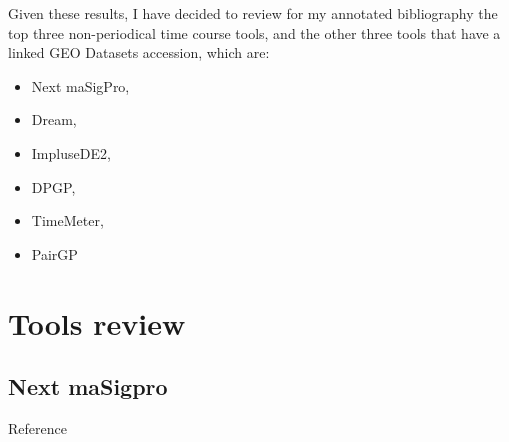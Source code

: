 \documentclass[10pt,a4paper]{article}
\newlength{\templength}
\newenvironment{ann_section}[1]
{\settowidth{\templength}{#1}%
\noindent\textbf{#1}
\hspace{1em}\begin{minipage}[t]{\dimexpr \linewidth-\the\templength-2em}}
{\end{minipage}\par\bigskip}
\begin{document}
Given these results, I have decided to review for my annotated bibliography the top three non-periodical time course tools, and the other three tools that have a linked GEO Datasets accession, which are:
\begin{itemize}
    \item Next maSigPro,
    \item Dream,
    \item ImpluseDE2,
    \item DPGP,
    \item TimeMeter,
    \item PairGP
\end{itemize}

\section{Tools review}
\subsection{Next maSigpro}
\begin{ann_section}{Reference}
\mbox{}
\end{ann_section}
\end{document}
